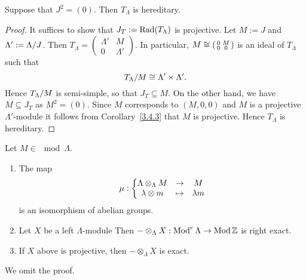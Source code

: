 \begin{lemma}\label{3.5.1}
Suppose that $J^2 = (0)$. Then $T_\Lambda$ is hereditary.
\end{lemma}


\begin{proof}
It suffices to show that $J_T := \operatorname{Rad}(T_\Lambda)$ is projective. Let $M := J$ and $\Lambda' := \Lambda/J$. Then $T_\Lambda =
(\begin{smallmatrix}
\Lambda' & M \\
0 & \Lambda'
\end{smallmatrix})
$. In particular, $ M \cong
(\begin{smallmatrix}
0 & M\\
0 & 0
\end{smallmatrix})$ is an ideal of $T_\Lambda$ such that
\[
T_\Lambda/M \cong \Lambda' \times \Lambda'.
\]
Hence $T_\Lambda/M$ is semi-simple, so that $J_T \subseteq M$. On the other hand, we have $M \subseteq J_T$ as $M^2 = (0)$. Since $M$ corresponds to $(M, 0, 0)$ and $M$ is a projective $\Lambda'$-module it follows from Corollary~\ref{3.4.3} that $M$ is projective. Hence $T_\Lambda$ is hereditary.
\end{proof}


\begin{lemma*}
Let $M \in \mod \Lambda$.
\begin{enumerate}
\item The map \[\mu: \left\{ \begin{matrix} \Lambda \otimes_\Lambda M & \to & M \\ \lambda \otimes m & \mapsto & \lambda m \end{matrix} \right.\] is an isomorphism of
abelian groups.
\item Let $X$ be a left $\Lambda$-module Then $- \otimes_\Lambda X: \operatorname{Mod}^r \Lambda \to \operatorname{Mod}{\mathbb{Z}}$ is right exact.
\item If $X$ above is projective, then $- \otimes_\Lambda X$ is exact.
\end{enumerate}
\end{lemma*}


We omit the proof.


